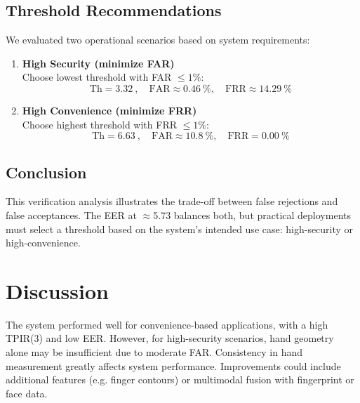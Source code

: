 \documentclass[a4paper,11pt]{article}
\begin{document}
\subsection{Threshold Recommendations}

We evaluated two operational scenarios based on system requirements:

\begin{enumerate}[label=\textbf{\arabic*)}, itemsep=0.8em]
    \item \textbf{High Security (minimize FAR)} \\
    \quad Choose lowest threshold with FAR $\leq 1\%$:
    \[
    \text{Th} = \SI{3.32}{}, \quad \text{FAR} \approx \SI{0.46}{\percent}, \quad \text{FRR} \approx \SI{14.29}{\percent}
    \]

    \item \textbf{High Convenience (minimize FRR)} \\
    \quad Choose highest threshold with FRR $\leq 1\%$:
    \[
    \text{Th} = \SI{6.63}{}, \quad \text{FAR} \approx \SI{10.8}{\percent}, \quad \text{FRR} = \SI{0.00}{\percent}
    \]
\end{enumerate}

\subsection{Conclusion}

This verification analysis illustrates the trade-off between false rejections and false acceptances. The EER at $\approx$5.73 balances both, but practical deployments must select a threshold based on the system's intended use case: high-security or high-convenience.

\section{Discussion}
The system performed well for convenience-based applications, with a high TPIR(3) and low EER. However, for high-security scenarios, hand geometry alone may be insufficient due to moderate FAR. Consistency in hand measurement greatly affects system performance. Improvements could include additional features (e.g. finger contours) or multimodal fusion with fingerprint or face data.
\end{document}
